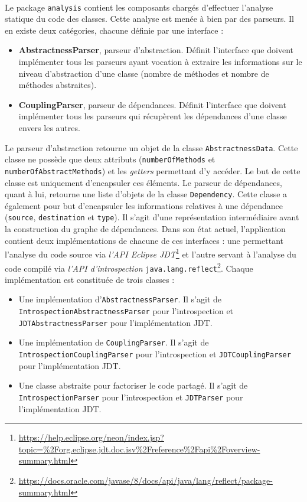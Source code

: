 \documentclass{scrartcl}
\begin{document}
    \paragraph{} Le package \texttt{analysis} contient les composants chargés d'effectuer l'analyse statique du code des classes. Cette analyse est menée à bien par des parseurs. Il en existe deux catégories, chacune définie par une interface :
    \begin{itemize}
    	\item \textbf{AbstractnessParser}, parseur d'abstraction. Définit l'interface que doivent implémenter tous les parseurs ayant vocation à extraire les informations sur le niveau d'abstraction d'une classe (nombre de méthodes et nombre de méthodes abstraites).
    	\item \textbf{CouplingParser}, parseur de dépendances. Définit l'interface que doivent implémenter tous les parseurs qui récupèrent les dépendances d'une classe envers les autres.
    \end{itemize}
    Le parseur d'abstraction retourne un objet de la classe \texttt{AbstractnessData}. Cette classe ne possède que deux attributs (\texttt{numberOfMethods} et \texttt{numberOfAbstractMethods}) et les \textit{getters} permettant d'y accéder. Le but de cette classe est uniquement d'encapsuler ces éléments.
    Le parseur de dépendances, quant à lui, retourne une liste d'objets de la classe \texttt{Dependency}. Cette classe a également pour but d'encapsuler les informations relatives à une dépendance (\texttt{source}, \texttt{destination} et \texttt{type}). Il s'agit d'une représentation intermédiaire avant la construction du graphe de dépendances.
    Dans son état actuel, l'application contient deux implémentations de chacune de ces interfaces : une permettant l'analyse du code source via \emph{l'API Eclipse JDT}\footnote{\url{https://help.eclipse.org/neon/index.jsp?topic=\%2Forg.eclipse.jdt.doc.isv\%2Freference\%2Fapi\%2Foverview-summary.html}} et l'autre servant à l'analyse du code compilé via \emph{l'API d'introspection} \texttt{java.lang.reflect}\footnote{\url{https://docs.oracle.com/javase/8/docs/api/java/lang/reflect/package-summary.html}}. Chaque implémentation est constituée de trois classes :
    \begin{itemize}
    	\item Une implémentation d'\texttt{AbstractnessParser}. Il s'agit de \texttt{IntrospectionAbstractnessParser} pour l'introspection et \texttt{JDTAbstractnessParser} pour l'implémentation JDT.
    	\item Une implémentation de \texttt{CouplingParser}. Il s'agit de \texttt{IntrospectionCouplingParser} pour l'introspection et \texttt{JDTCouplingParser} pour l'implémentation JDT.
    	\item Une classe abstraite pour factoriser le code partagé. Il s'agit de \texttt{IntrospectionParser} pour l'introspection et \texttt{JDTParser} pour l'implémentation JDT.
	\end{itemize}
\end{document}
